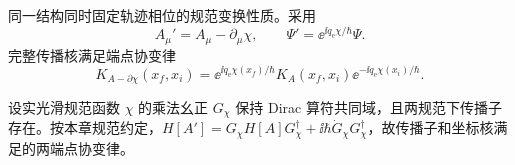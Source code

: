 同一结构同时固定轨迹相位的规范变换性质。采用
\begin{equation}
\boxed{
A_\mu' = A_\mu-\partial_\mu\chi,
\qquad
\Psi' = \ee^{\ii q_{\mathrm e}\chi/\hbar}\Psi.}
\label{eq:external_field_gauge_transformation}
\end{equation}
完整传播核满足端点协变律
\begin{equation}
\boxed{
K_{A-\partial\chi}(x_f,x_i)
=\ee^{\ii q_{\mathrm e}\chi(x_f)/\hbar}
K_A(x_f,x_i)
\ee^{-\ii q_{\mathrm e}\chi(x_i)/\hbar}.}
\label{eq:exact_dirac_kernel_gauge_covariance}
\end{equation}

\begin{theorem}[时间依赖规范变换的端点协变性]
设实光滑规范函数 $\chi$ 的乘法幺正 $G_\chi$ 保持 Dirac 算符共同域，且两规范下传播子存在。按本章规范约定，$H[A\prime]=G_\chi H[A]G_\chi^\dagger+\ii\hbar\dot G_\chi G_\chi^\dagger$，故传播子和坐标核满足的两端点协变律。
\end{theorem}
